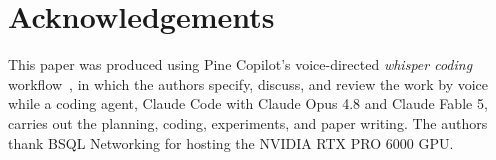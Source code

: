 \documentclass[11pt]{article}
\begin{document}


\section*{Acknowledgements}
This paper was produced using Pine Copilot's voice-directed \emph{whisper coding} workflow~\citep{pineai2026whispercoding}, in which the authors specify, discuss, and review the work by voice while a coding agent, Claude Code with Claude Opus 4.8 and Claude Fable 5, carries out the planning, coding, experiments, and paper writing.
The authors thank BSQL Networking for hosting the NVIDIA RTX PRO 6000 GPU.





\end{document}
